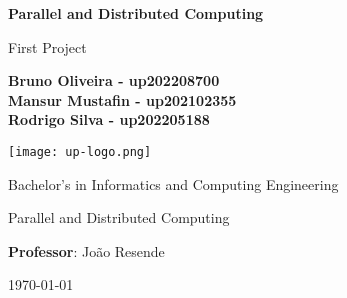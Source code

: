 \begin{titlepage}
\begin{center}

\vspace*{1cm}
{\fontsize{17}{16}\selectfont \textbf{Parallel and Distributed Computing}}

\vspace{0.5cm}
First Project

\vspace{1.5cm}
\textbf{Bruno Oliveira - up202208700}\\
\textbf{Mansur Mustafin - up202102355}\\ %
\textbf{Rodrigo Silva - up202205188}\\ %
\vfill

\texttt{[image: up-logo.png]}
\vfill

Bachelor's in Informatics and Computing Engineering

Parallel and Distributed Computing
\vspace{0.8cm}

\textbf{Professor}: João Resende

\vspace{0.4cm}
\monthyear \today

\end{center}
\end{titlepage}

\clearpage